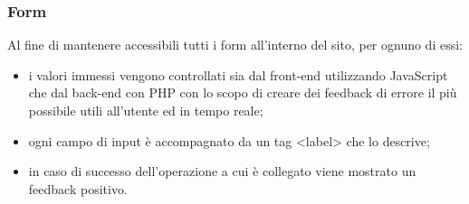 \subsubsection{Form}
Al fine di mantenere accessibili tutti i form all'interno del sito, per ognuno di essi:
\begin{itemize}
    \item i valori immessi vengono controllati sia dal front-end utilizzando JavaScript che dal back-end con PHP con lo scopo di creare dei feedback di errore il più possibile utili all'utente ed in tempo reale;
    \item ogni campo di input è accompagnato da un tag <label> che lo descrive;
    \item in caso di successo dell'operazione a cui è collegato viene mostrato un feedback positivo.
\end{itemize}
